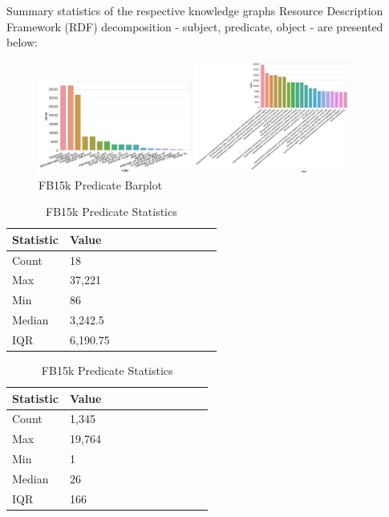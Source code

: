 Summary statistics of the respective knowledge graphs Resource Description Framework (RDF) decomposition - subject, predicate, object - are presented below:


\begin{figure}[H]
	\parbox{.5\linewidth}{
   		\caption{WN18 Predicate Barplot}
   		\centering
    		\includegraphics[width=0.45\textwidth, height=0.2\textheight]{WN18_Predicate_Counts}
		}
	\hfill
	\parbox{.5\linewidth}{
		\caption{FB15k Predicate Barplot}
   		\centering
		\includegraphics[width=0.45\textwidth, height=0.2\textheight]{FB15k_Predicate_Counts}
		}
\end{figure}

\begin{table}[H]
	\parbox{.5\linewidth}{
		\caption{WN18 Predicate Statistics}
		\centering
		\begin{tabular}{lllllllllll}
  			\textbf{Statistic} & \textbf{Value}  \\
  			\hline
			Count & 18 \\
			Max & 37,221  \\
			Min & 86 \\
  			Median & 3,242.5  \\
  			IQR & 6,190.75  \\
		\end{tabular}
		}
	\hfill
	\parbox{.5\linewidth}{
		\caption{FB15k Predicate Statistics}
		\centering
		\begin{tabular}{lllllllllll}
  			\textbf{Statistic} & \textbf{Value}  \\
  			\hline
			Count & 1,345 \\
			Max & 19,764  \\
			Min & 1  \\
  			Median & 26  \\
  			IQR & 166  \\
		\end{tabular}
		}
\end{table}

